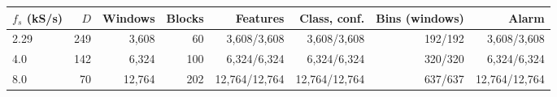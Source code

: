 \begin{tabular}{@{}lrrrrrrr@{}}
\toprule
$f_s$ (kS/s) & $D$ & Windows & Blocks & Features & Class, conf. & Bins (windows) & Alarm \\
\midrule
2.29 & 249 & 3,608 & 60 & 3,608/3,608 & 3,608/3,608 & 192/192 & 3,608/3,608 \\
4.0 & 142 & 6,324 & 100 & 6,324/6,324 & 6,324/6,324 & 320/320 & 6,324/6,324 \\
8.0 & 70 & 12,764 & 202 & 12,764/12,764 & 12,764/12,764 & 637/637 & 12,764/12,764 \\
\bottomrule
\end{tabular}
